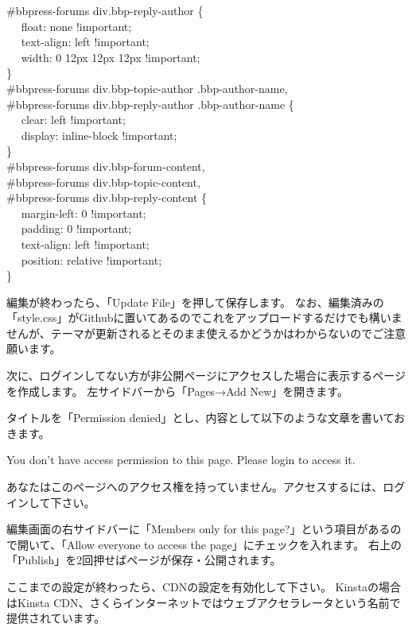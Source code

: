 \documentclass[titlepage,10pt,a4paper,uplatex]{jsbook}
\newenvironment{content}{\begin{shaded}\vspace{-1em}\raggedright\ttfamily\footnotesize\setlength{\baselineskip}{1.4em}}{\end{shaded}\vspace{-1em}}
\begin{document}
\begin{content}
\#bbpress-forums div.bbp-reply-author \{\\
 ~ ~float: none !important;\\
 ~ ~text-align: left !important;\\
 ~ ~width: 0 12px 12px 12px !important;\\
\}\\
\#bbpress-forums div.bbp-topic-author .bbp-author-name,\\
\#bbpress-forums div.bbp-reply-author .bbp-author-name \{\\
 ~ ~clear: left !important;\\
 ~ ~display: inline-block !important;\\
\}\\
\#bbpress-forums div.bbp-forum-content,\\
\#bbpress-forums div.bbp-topic-content,\\
\#bbpress-forums div.bbp-reply-content \{\\
 ~ ~margin-left: 0 !important;\\
 ~ ~padding: 0 !important;\\
 ~ ~text-align: left !important;\\
 ~ ~position: relative !important;\\
\}
\end{content}

編集が終わったら、「Update File」を押して保存します。
なお、編集済みの「style.css」がGithubに置いてあるのでこれをアップロードするだけでも構いませんが、テーマが更新されるとそのまま使えるかどうかはわからないのでご注意願います。

次に、ログインしてない方が非公開ページにアクセスした場合に表示するページを作成します。
左サイドバーから「Pages→Add New」を開きます。

タイトルを「Permission denied」とし、内容として以下のような文章を書いておきます。

\begin{content}
You don't have access permission to this page. Please login to access it.

あなたはこのページへのアクセス権を持っていません。アクセスするには、ログインして下さい。
\end{content}

編集画面の右サイドバーに「Members only for this page?」という項目があるので開いて、「Allow everyone to access the page」にチェックを入れます。
右上の「Publish」を2回押せばページが保存・公開されます。

ここまでの設定が終わったら、CDNの設定を有効化して下さい。
Kinstaの場合はKinsta CDN、さくらインターネットではウェブアクセラレータという名前で提供されています。
\end{document}
